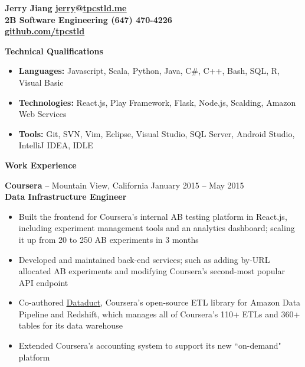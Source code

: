 \documentclass{letter}
\begin{document}
  \thispagestyle{empty}


{\bfseries
  {\Large Jerry Jiang} \hfill \href{mailto:jerry@tpcstld.me}{\uline{jerry}}@\href{//tpcstld.me}{\uline{tpcstld.me}} \\
  2B Software Engineering \hfill (647) 470-4226 \\
\null \hfill \href{https://github.com/tpcstld}{\uline{github.com/tpcstld}}} \\
\null \hrulefill

{\bfseries \Large Technical Qualifications}
\vspace{-3mm}
\begin{itemize}
    \item {\bfseries Languages:}
        Javascript, Scala, Python, Java, C\#, C++, Bash, SQL, R, Visual Basic
    \item {\bfseries Technologies:}
        React.js, Play Framework, Flask, Node.js, Scalding, Amazon Web Services
    \item {\bfseries Tools:}
        Git, SVN, Vim, Eclipse, Visual Studio, SQL Server, Android Studio, IntelliJ IDEA, IDLE
\end{itemize}

{\bfseries \Large Work Experience}

\vspace{-1.5mm}
{\bfseries Coursera} -- Mountain View, California \hfill January 2015 -- May 2015 \\
{\bfseries Data Infrastructure Engineer}
\vspace{-3mm}
\begin{itemize}
    \item Built the frontend for Coursera's internal AB testing platform in React.js, including
      experiment management tools and an analytics dashboard; scaling it up from 20 to
      250 AB experiments in 3 months
    \item Developed and maintained back-end services; such as adding by-URL allocated
      AB experiments and modifying Coursera's second-most popular API endpoint
    \item Co-authored \href{https://github.com/coursera/dataduct}{\uline{Dataduct}},
      Coursera's open-source ETL library for Amazon Data Pipeline and
      Redshift, which manages all of Coursera's 110+ ETLs and 360+ tables for its data warehouse
    \item Extended Coursera's accounting system to support its new ``on-demand" platform
\end{itemize}
\end{document}
